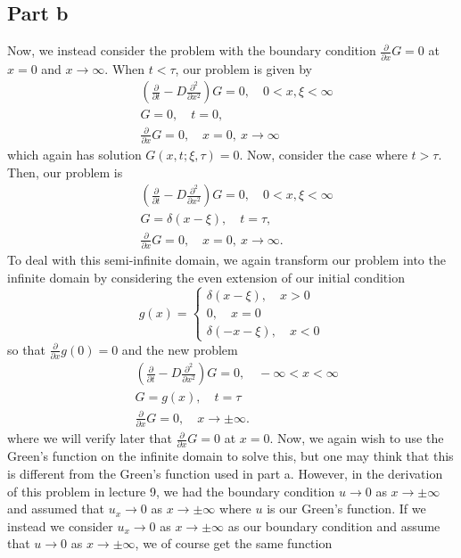 \documentclass{article}
\begin{document}
\subsection{Part b}
Now, we instead consider the problem with the boundary condition $\frac{\partial}{\partial x}G=0$ at $x=0$ and $x\to\infty$. When $t<\tau$, our problem is given by
\begin{align*}
	&\left(\frac{\partial}{\partial t}-D\frac{\partial^2}{\partial x^2}\right)G=0, \quad 0<x,\xi<\infty\\
	&G=0, \quad t=0,\\
	&\frac{\partial}{\partial x}G=0, \quad x=0,~x\to\infty
\end{align*}
which again has solution $G(x,t;\xi,\tau)=0$. Now, consider the case where $t>\tau$. Then, our problem is
\begin{align*}
	&\left(\frac{\partial}{\partial t}-D\frac{\partial^2}{\partial x^2}\right)G=0, \quad 0<x,\xi<\infty\\
	&G=\delta(x-\xi), \quad t=\tau,\\
	&\frac{\partial}{\partial x}G=0, \quad x=0,~x\to\infty.
\end{align*}
To deal with this semi-infinite domain, we again transform our problem into the infinite domain by considering the even extension of our initial condition 
\[
g(x)=\begin{cases}
	\delta(x-\xi), \quad x>0\\
	0, \quad x=0\\
	\delta(-x-\xi), \quad x<0
\end{cases}
\]
so that $\frac{\partial}{\partial x}g(0)=0$ and the new problem
\begin{align*}
	&\left(\frac{\partial}{\partial t}-D\frac{\partial^2}{\partial x^2}\right)G=0, \quad -\infty<x<\infty\\
	&G=g(x), \quad t=\tau\\
	&\frac{\partial}{\partial x}G=0, \quad x\to\pm\infty.
\end{align*}
where we will verify later that $\frac{\partial}{\partial x}G=0$ at $x=0$. Now, we again wish to use the Green's function on the infinite domain to solve this, but one may think that this is different from the Green's function used in part a. However, in the derivation of this problem in lecture 9, we had the boundary condition $u\to0$ as $x\to\pm\infty$ and assumed that $u_x\to0$ as $x\to\pm\infty$ where $u$ is our Green's function. If we instead we consider $u_x\to0$ as $x\to\pm\infty$ as our boundary condition and assume that $u\to0$ as $x\to\pm\infty$, we of course get the same function 
\end{document}
